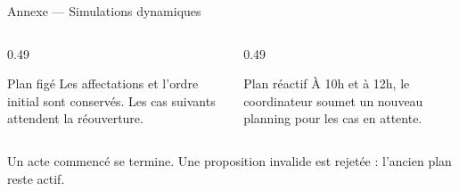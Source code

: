 \begin{frame}{Annexe --- Simulations dynamiques}
  \scriptsize
  \centering

  \vspace{0.25cm}
  \begin{columns}[T,onlytextwidth]
    \begin{column}{0.49\textwidth}
      \begin{block}{Plan figé}
        \footnotesize Les affectations et l'ordre initial sont conservés.
        Les cas suivants attendent la réouverture.
      \end{block}
    \end{column}
    \begin{column}{0.49\textwidth}
      \begin{exampleblock}{Plan réactif}
        \footnotesize À 10h et à 12h, le coordinateur soumet un nouveau
        planning pour les cas en attente.
      \end{exampleblock}
    \end{column}
  \end{columns}

  \vspace{0.10cm}
  \centering\footnotesize Un acte commencé se termine. Une proposition
  invalide est rejetée : l'ancien plan reste actif.
\end{frame}

